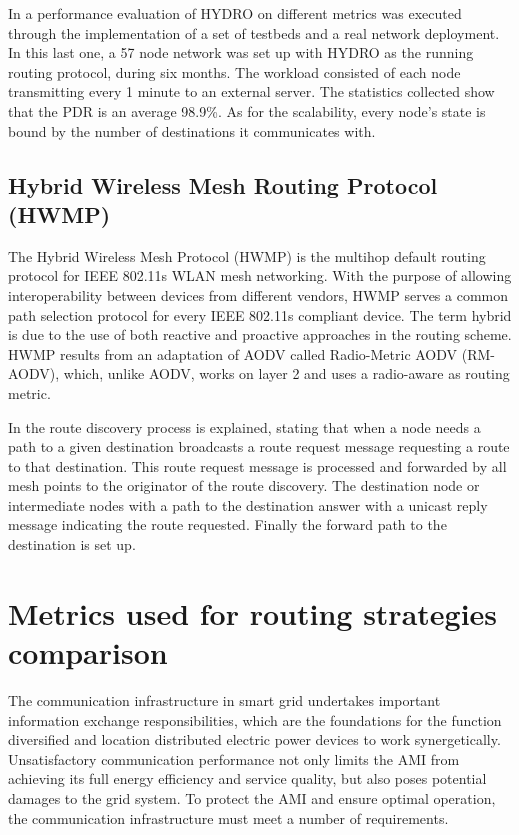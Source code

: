 \documentclass[11pt,final,onecolumn]{IEEEtran}
\begin{document}
In \cite{Dawson2010} a performance evaluation of HYDRO on different metrics was executed through the implementation of a set of testbeds and a real network deployment. In this last one, a 57 node network was set up with HYDRO as the running routing protocol, during six months. The workload consisted of each node transmitting every 1 minute to an external server. The statistics collected show that the PDR is an average 98.9\%. As for the scalability, every node’s state is bound by the number of destinations it communicates with. 

\subsection{Hybrid Wireless Mesh Routing Protocol (HWMP)}\label{hwmp}

The Hybrid Wireless Mesh Protocol (HWMP) is the multihop default routing protocol for IEEE 802.11s WLAN mesh networking. With the purpose of allowing interoperability between devices from different vendors, HWMP serves a common path selection protocol for every IEEE 802.11s compliant device. The term hybrid is due to the use of both reactive and proactive approaches in the routing scheme. HWMP results from an adaptation of AODV called Radio-Metric AODV (RM-AODV), which, unlike AODV, works on layer 2 and uses a radio-aware as routing metric. 

In \cite{Bahr2006} the route discovery process is explained, stating that when a node needs a path to a given destination broadcasts a route request message requesting a route to that destination. This route request message is processed and forwarded by all mesh points to the originator of the route discovery. The destination node or intermediate nodes with a path to the destination answer with a unicast reply message indicating the route requested. Finally the forward path to the destination is set up. 


\section{Metrics used for routing strategies comparison}\label{metrics}

The communication infrastructure in smart grid undertakes important information exchange responsibilities, which are the foundations for the function diversified and location distributed electric power devices to work synergetically. Unsatisfactory communication performance not only limits the AMI from achieving its full energy efficiency and service quality, but also poses potential damages to the grid system. To protect the AMI and ensure optimal operation, the communication infrastructure must meet a number of requirements.
\end{document}
